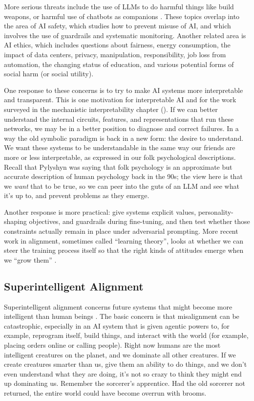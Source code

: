 More serious threats include the use of LLMs to do harmful things like build weapons, or harmful use of chatbots as companions
\cite{wikichatbotdeaths2026}. These topics overlap into the area of AI safety, which studies how to prevent misuse of AI, and which involves the use of guardrails and systematic monitoring. Another related area is AI ethics, which includes
questions about fairness, energy consumption, the impact of data centers, privacy, manipulation, responsibility, job loss from automation, the changing status of education, and various potential forms of social harm (or social utility).

One response to these concerns is to try to make AI systems more interpretable
and transparent. This is one motivation for interpretable AI and for the work
surveyed in the mechanistic interpretability chapter (). If we can better understand the internal circuits, features, and representations that run these networks, we may be in a better position to diagnose and correct failures. In a way the old symbolic paradigm is back in a new form: the desire to understand. We want these systems to be understandable in the same way our friends are more or less interpretable, as expressed in our folk psychological descriptions. Recall that Pylyshyn was saying that folk psychology is an approximate but accurate description of human psychology back in the 90s; the view here is that we \emph{want} that to be true, so we can peer into the guts of an LLM and see what it's up to, and prevent problems as they emerge.

Another response is more practical: give systems explicit values,
personality-shaping objectives, and guardrails during fine-tuning, and then test whether those constraints actually remain in place under adversarial prompting.
More recent work in alignment, sometimes called ``learning theory'', looks at whether we
can steer the training process itself so that the right kinds of attitudes emerge when we ``grow them''
\cite{aisi2026learningtheory}.

\subsection{Superintelligent Alignment}

Superintelligent alignment concerns future systems that might become more intelligent than human beings
\cite{bostrom2014superintelligence,yudkowsky2025ifanyone}.
The basic concern is that misalignment can be catastrophic, especially in an AI system that is given agentic powers to, for example, reprogram itself, build things, and interact with the world (for example, placing orders online or calling people). Right now humans are the most intelligent creatures on the planet, and we dominate all other creatures. If we create creatures smarter than us, give them an ability to do things, and we don't even understand what they are doing, it's not so crazy to think they might end up dominating us. Remember the sorcerer's apprentice. Had the old sorcerer not returned, the entire world could have become overrun with brooms.

